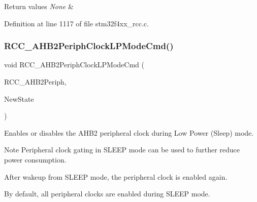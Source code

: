 \begin{DoxyRetVals}{Return values}
{\em None} & \\
\hline
\end{DoxyRetVals}


Definition at line 1117 of file stm32f4xx\+\_\+rcc.\+c.

\mbox{\label{group___r_c_c___group3_ga1ac5bb9676ae9b48e50d6a95de922ce3}} 
\subsubsection{\texorpdfstring{R\+C\+C\+\_\+\+A\+H\+B2\+Periph\+Clock\+L\+P\+Mode\+Cmd()}{RCC\_AHB2PeriphClockLPModeCmd()}}
{\footnotesize\ttfamily void R\+C\+C\+\_\+\+A\+H\+B2\+Periph\+Clock\+L\+P\+Mode\+Cmd (\begin{DoxyParamCaption}\item[{uint32\+\_\+t}]{R\+C\+C\+\_\+\+A\+H\+B2\+Periph,  }\item[{Functional\+State}]{New\+State }\end{DoxyParamCaption})}



Enables or disables the A\+H\+B2 peripheral clock during Low Power (Sleep) mode. 

\begin{DoxyNote}{Note}
Peripheral clock gating in S\+L\+E\+EP mode can be used to further reduce power consumption. 

After wakeup from S\+L\+E\+EP mode, the peripheral clock is enabled again. 

By default, all peripheral clocks are enabled during S\+L\+E\+EP mode. 
\end{DoxyNote}

